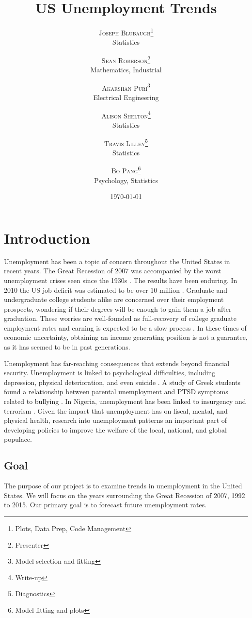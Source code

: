 \documentclass[twoside,twocolumn]{article}
\title{US Unemployment Trends} %
\author{%
\textsc{Joseph Blubaugh}\thanks{Plots, Data Prep, Code Management} \\[1ex] %
\normalsize Statistics\\ %
\and %
\textsc{Sean Roberson}\thanks{Presenter} \\[1ex] %
\normalsize Mathematics, Industrial\\ %
\and 
\textsc{Akarshan Puri}\thanks{Model selection and fitting} \\[1ex] 
\normalsize Electrical Engineering\\ 
\and 
\textsc{Alison Shelton}\thanks{Write-up} \\[1ex] 
\normalsize Statistics\\ 
\and 
\textsc{Travis Lilley}\thanks{Diagnostics} \\[1ex] 
\normalsize Statistics\\ 
\and
\textsc{Bo Pang}\thanks{Model fitting and plots} \\[1 ex]
\normalsize Psychology, Statistics
\vspace*{.5 cm}
}
\date{\today \vspace*{.25 cm}} %
\begin{document}
\maketitle



\section{Introduction}
		Unemployment has been a topic of concern throughout the United States in recent years.  The Great Recession of 2007 was accompanied by the worst unemployment crises seen since the 1930s \citep{wanberg2012individual}.   The results have been enduring. In 2010 the US job deficit was estimated to be over 10 million \citep{katz2010}. Graduate and undergraduate college students alike are concerned over their employment prospects, wondering if their degrees will be enough to gain them a job after graduation.  These worries are well-founded as full-recovery of college graduate employment rates and earning is expected to be a slow process \citep{carnevale2015hard}.  In these times of economic uncertainty, obtaining an income generating position is not a guarantee, as it has seemed to be in past generations.
		
Unemployment has far-reaching consequences that extends beyond financial security. Unemployment is linked to psychological difficulties, including depression, physical deterioration, and even suicide  \citep{wanberg2012individual, insecure, suicide}. A study of Greek students found a relationship between parental unemployment and PTSD symptoms related to bullying \citep{kanellopoulos2014epa}. In Nigeria, unemployment has been linked to insurgency and terrorism \citep{terrorism}. Given the impact that unemployment has on fiscal, mental, and physical health, research into unemployment patterns an important part of developing policies to improve the welfare of the local, national, and global populace.

\subsection{Goal}
		The purpose of our project is to examine trends in unemployment in the United States. We will focus on the years surrounding the Great Recession of 2007, 1992 to 2015.  Our primary goal is to forecast future unemployment rates. 
\end{document}
